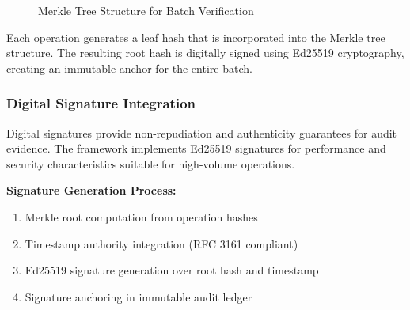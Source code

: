 \documentclass[12pt,a4paper]{article}
\begin{document}
\begin{figure}[H]
\centering
{}
\caption{Merkle Tree Structure for Batch Verification}
\label{fig:merkle}
\end{figure}

Each operation generates a leaf hash that is incorporated into the Merkle tree structure. The resulting root hash is digitally signed using Ed25519 cryptography, creating an immutable anchor for the entire batch.

\subsubsection{Digital Signature Integration}

Digital signatures provide non-repudiation and authenticity guarantees for audit evidence. The framework implements Ed25519 signatures for performance and security characteristics suitable for high-volume operations.

\textbf{Signature Generation Process:}
\begin{enumerate}
\item Merkle root computation from operation hashes
\item Timestamp authority integration (RFC 3161 compliant)
\item Ed25519 signature generation over root hash and timestamp
\item Signature anchoring in immutable audit ledger
\end{enumerate}

\begin{center}
\end{center}
\end{document}
